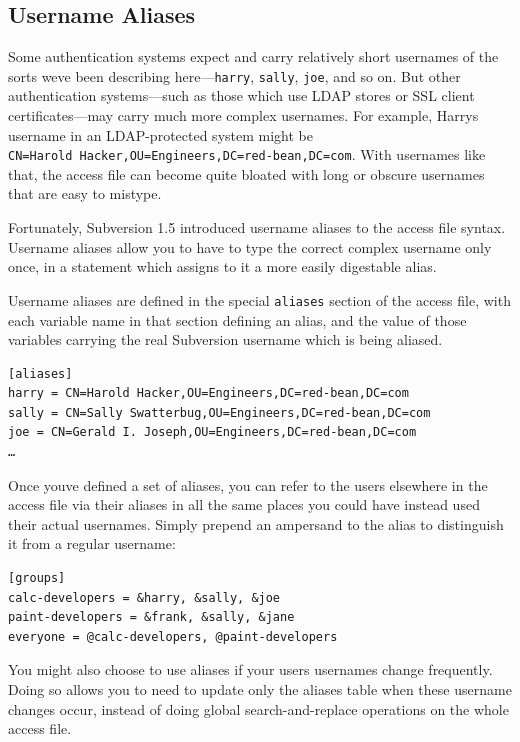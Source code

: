 \subsection{Username
Aliases}\label{svn.serverconfig.pathbasedauthz.aliases}

Some authentication systems expect and carry relatively short usernames
of the sorts we\textquotesingle ve been describing
here---\texttt{harry}, \texttt{sally}, \texttt{joe}, and so on. But
other authentication systems---such as those which use LDAP stores or
SSL client certificates---may carry much more complex usernames. For
example, Harry\textquotesingle s username in an LDAP-protected system
might be \texttt{CN=Harold\ Hacker,OU=Engineers,DC=red-bean,DC=com}.
With usernames like that, the access file can become quite bloated with
long or obscure usernames that are easy to mistype.

Fortunately, Subversion 1.5 introduced username aliases to the access
file syntax. Username aliases allow you to have to type the correct
complex username only once, in a statement which assigns to it a more
easily digestable alias.

Username aliases are defined in the special \texttt{aliases} section of
the access file, with each variable name in that section defining an
alias, and the value of those variables carrying the real Subversion
username which is being aliased.

\begin{verbatim}
[aliases]
harry = CN=Harold Hacker,OU=Engineers,DC=red-bean,DC=com
sally = CN=Sally Swatterbug,OU=Engineers,DC=red-bean,DC=com
joe = CN=Gerald I. Joseph,OU=Engineers,DC=red-bean,DC=com
…
\end{verbatim}

Once you\textquotesingle ve defined a set of aliases, you can refer to
the users elsewhere in the access file via their aliases in all the same
places you could have instead used their actual usernames. Simply
prepend an ampersand to the alias to distinguish it from a regular
username:

\begin{verbatim}
[groups]
calc-developers = &harry, &sally, &joe
paint-developers = &frank, &sally, &jane
everyone = @calc-developers, @paint-developers
\end{verbatim}

You might also choose to use aliases if your users\textquotesingle{}
usernames change frequently. Doing so allows you to need to update only
the aliases table when these username changes occur, instead of doing
global search-and-replace operations on the whole access file.


